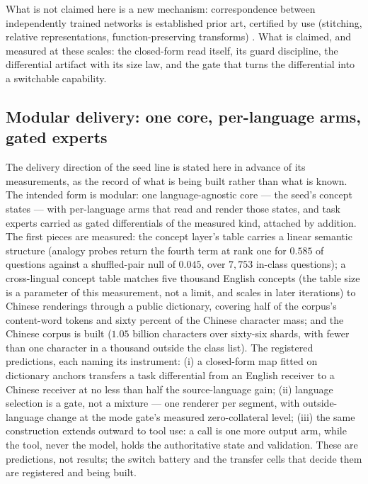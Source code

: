\documentclass[11pt]{article}
\begin{document}
What is not claimed here is a new mechanism: correspondence
between independently trained networks is established prior art,
certified by use (stitching, relative representations,
function-preserving transforms) \cite{stitch2026,moschella2022,
relgeom2024,fpt2024}. What is claimed, and measured at these
scales: the closed-form read itself, its guard discipline, the
differential artifact with its size law, and the gate that turns
the differential into a switchable capability.

\subsection{Modular delivery: one core, per-language arms, gated
experts}

The delivery direction of the seed line is stated here in advance
of its measurements, as the record of what is being built rather
than what is known. The intended form is modular: one
language-agnostic core --- the seed's concept states --- with
per-language arms that read and render those states, and task
experts carried as gated differentials of the measured kind,
attached by addition. The first pieces are measured: the concept
layer's table carries a linear semantic structure (analogy probes
return the fourth term at rank one for $0.585$ of questions
against a shuffled-pair null of $0.045$, over $7{,}753$
in-class questions); a cross-lingual concept table matches five
thousand English concepts (the table size is a parameter of this
measurement, not a limit, and scales in later iterations) to
Chinese renderings through a public
dictionary, covering half of the corpus's content-word tokens and
sixty percent of the Chinese character mass; and the Chinese
corpus is built ($1.05$ billion characters over sixty-six
shards, with fewer than one character in a thousand outside the
class list). The registered predictions, each naming its
instrument: (i) a closed-form map fitted on dictionary anchors
transfers a task differential from an English receiver to a
Chinese receiver at no less than half the source-language gain;
(ii) language selection is a gate, not a mixture --- one renderer
per segment, with outside-language change at the mode gate's
measured zero-collateral level; (iii) the same construction
extends outward to tool use: a call is one more output arm,
while the tool, never the model, holds the authoritative state
and validation. These are predictions, not results; the switch
battery and the transfer cells that decide them are registered
and being built.
\end{document}
